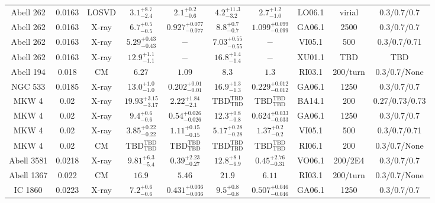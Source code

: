 \begin{table}
\begin{tabular}{cccccccccc}
Abell 262 & 0.0163 & LOSVD & ${3.1}^{+8.7}_{-2.4}$ & ${2.1}^{+0.2}_{-0.6}$ & ${4.2}^{+11.3}_{-3.2}$ & ${2.7}^{+1.2}_{-1.0}$ & LO06.1 & virial & 0.3/0.7/0.7 \\
Abell 262 & 0.0163 & X-ray & ${6.7}^{+0.5}_{-0.5}$ & ${0.927}^{+0.077}_{-0.077}$ & ${8.8}^{+0.7}_{-0.7}$ & ${1.099}^{+0.099}_{-0.099}$ & GA06.1 & 2500 & 0.3/0.7/0.7 \\
Abell 262 & 0.0163 & X-ray & ${5.29}^{+0.43}_{-0.43}$ & ${-}^{}_{}$ & ${7.03}^{+0.55}_{-0.55}$ & ${-}^{}_{}$ & VI05.1 & 500 & 0.3/0.7/0.71 \\
Abell 262 & 0.0163 & X-ray & ${12.9}^{+1.1}_{-1.1}$ & ${-}^{}_{}$ & ${16.8}^{+1.4}_{-1.4}$ & ${-}^{}_{}$ & XU01.1 & TBD & TBD \\
Abell 194 & 0.018 & CM & ${6.27}^{}_{}$ & ${1.09}^{}_{}$ & ${8.3}^{}_{}$ & ${1.3}^{}_{}$ & RI03.1 & 200/turn & 0.3/0.7/None \\
NGC 533 & 0.0185 & X-ray & ${13.0}^{+1.0}_{-1.0}$ & ${0.202}^{+0.01}_{-0.01}$ & ${16.9}^{+1.3}_{-1.3}$ & ${0.229}^{+0.012}_{-0.012}$ & GA06.1 & 1250 & 0.3/0.7/0.7 \\
MKW 4 & 0.02 & X-ray & ${19.93}^{+3.15}_{-3.17}$ & ${2.22}^{+1.84}_{-2.1}$ & ${\mathrm{TBD}}^{\mathrm{TBD}}_{\mathrm{TBD}}$ & ${\mathrm{TBD}}^{\mathrm{TBD}}_{\mathrm{TBD}}$ & BA14.1 & 200 & 0.27/0.73/0.73 \\
MKW 4 & 0.02 & X-ray & ${9.4}^{+0.6}_{-0.6}$ & ${0.54}^{+0.026}_{-0.026}$ & ${12.3}^{+0.8}_{-0.8}$ & ${0.624}^{+0.033}_{-0.033}$ & GA06.1 & 1250 & 0.3/0.7/0.7 \\
MKW 4 & 0.02 & X-ray & ${3.85}^{+0.22}_{-0.22}$ & ${1.11}^{+0.15}_{-0.15}$ & ${5.17}^{+0.28}_{-0.28}$ & ${1.37}^{+0.2}_{-0.2}$ & VI05.1 & 500 & 0.3/0.7/0.71 \\
MKW 4 & 0.02 & CM & ${\mathrm{TBD}}^{\mathrm{TBD}}_{\mathrm{TBD}}$ & ${\mathrm{TBD}}^{\mathrm{TBD}}_{\mathrm{TBD}}$ & ${\mathrm{TBD}}^{\mathrm{TBD}}_{\mathrm{TBD}}$ & ${\mathrm{TBD}}^{\mathrm{TBD}}_{\mathrm{TBD}}$ & RI06.1 & 200 & 0.3/0.7/None \\
Abell 3581 & 0.0218 & X-ray & ${9.81}^{+6.3}_{-5.4}$ & ${0.39}^{+2.23}_{-0.27}$ & ${12.8}^{+8.1}_{-6.9}$ & ${0.45}^{+2.76}_{-0.31}$ & VO06.1 & 200/2E4 & 0.3/0.7/0.7 \\
Abell 1367 & 0.022 & CM & ${16.9}^{}_{}$ & ${5.46}^{}_{}$ & ${21.9}^{}_{}$ & ${6.11}^{}_{}$ & RI03.1 & 200/turn & 0.3/0.7/None \\
IC 1860 & 0.0223 & X-ray & ${7.2}^{+0.6}_{-0.6}$ & ${0.431}^{+0.036}_{-0.036}$ & ${9.5}^{+0.8}_{-0.8}$ & ${0.507}^{+0.046}_{-0.046}$ & GA06.1 & 1250 & 0.3/0.7/0.7 \\

\end{tabular}
\end{table}
